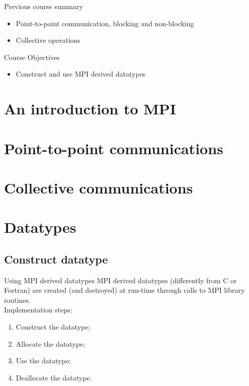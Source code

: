 \documentclass[aspectratio=43]{beamer}
\begin{document}
\cscstitle

\begin{frame}{Previous course summary}
\begin{itemize}
\item Point-to-point communication, blocking and non-blocking
\item Collective operations
\end{itemize}
\end{frame}

\begin{frame}{Course Objectives}
\begin{itemize}
\item Construct and use MPI derived datatypes
\end{itemize}
\end{frame}


\section{An introduction to MPI}
\section{Point-to-point communications}
\section{Collective communications}
\section{Datatypes}


\subsection{Construct datatype}

\begin{frame}[fragile]{Using MPI derived datatypes}
MPI derived datatypes (differently from C or Fortran) are created (and destroyed) at run-time through calls to MPI library routines.\\
Implementation steps:
\begin{enumerate}
\item Construct the datatype;
\item Allocate the datatype;
\item Use the datatype;
\item Deallocate the datatype.
\end{enumerate}
\end{frame}
\end{document}
